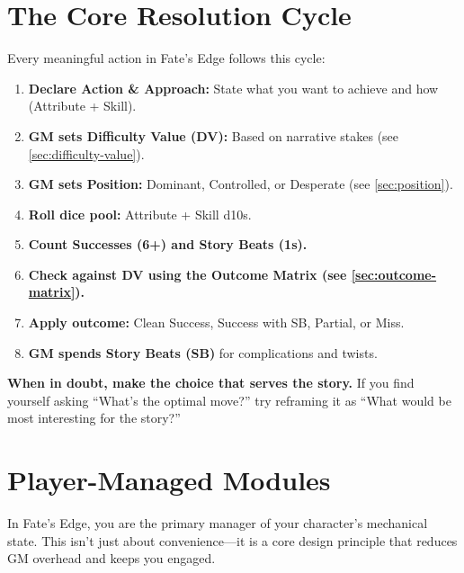 \section{The Core Resolution Cycle}
\label{sec:core-resolution-cycle}

Every meaningful action in Fate's Edge follows this cycle:

\begin{enumerate}
  \item \textbf{Declare Action \& Approach:} State what you want to achieve and how (Attribute + Skill).
  \item \textbf{GM sets Difficulty Value (DV):} Based on narrative stakes (see \ref{sec:difficulty-value}).
  \item \textbf{GM sets Position:} Dominant, Controlled, or Desperate (see \ref{sec:position}).
  \item \textbf{Roll dice pool:} Attribute + Skill d10s.
  \item \textbf{Count Successes (6+) and Story Beats (1s).}
  \item \textbf{Check against DV using the Outcome Matrix (see \ref{sec:outcome-matrix}).}
  \item \textbf{Apply outcome:} Clean Success, Success with SB, Partial, or Miss.
  \item \textbf{GM spends Story Beats (SB)} for complications and twists.
\end{enumerate}

\begin{tcolorbox}[colback=yellow!5!white,colframe=yellow!75!black,title=\textbf{Golden Rule},breakable]
\textbf{When in doubt, make the choice that serves the story.} If you find yourself asking ``What's the optimal move?'' try reframing it as ``What would be most interesting for the story?''
\end{tcolorbox}

\section{Player-Managed Modules}
\label{sec:player-managed-modules}

In Fate's Edge, you are the primary manager of your character's mechanical state. This isn't just about convenience---it is a core design principle that reduces GM overhead and keeps you engaged.

